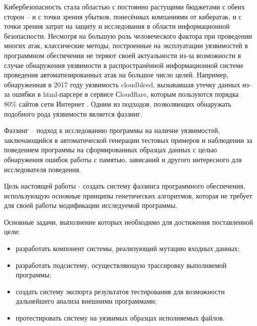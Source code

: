 \label{sec:intro}


Кибербезопасность стала областью с постоянно растущими бюджетами с обеих сторон -- и с точки зрения убытков, понесённых компаниями от кибератак, и с точки зрения затрат на защиту и исследования в области информационной безопасности. Несмотря на большую роль человеческого фактора при проведении многих атак, классические методы, построенные на эксплуатации уязвимостей в программном обеспечении не теряют своей актуальности из-за возможности в случае обнаружения уязвимости в распространённой информационной системе проведения автоматизированных атак на большое число целей. Например, обнаруженная в 2017 году уязвимость cloudbleed, вызывавшая утечку данных из-за ошибки в html-парсере в сервисе Сloudflare, которым пользуются порядка 80\% сайтов сети Интернет \cite{cloudbleed}. Одним из подходов, позволяющих обнаружать подобного рода уязвимости является фаззинг.





Фаззинг -- подход к исследованию программы на наличие уязвимостей, заключающийся в автоматической генерации тестовых примеров и наблюдении за поведением программы на сформированных образцах данных с целью обнаружения ошибок работы с памятью, зависаний и другого интересного для исследователя поведения.

Цель настоящей работы - создать систему фаззинга программного обеспечения, использующую основные принципы генетических алгоритмов, которая не требует для своей работы модификации исследуемой программы.

Основные задачи, выполнение которых необходимо для достижения поставленной цели:

\begin{itemize}
	\item разработать компонент системы, реализующий мутацию входных данных;
	
	\item разработать подсистему, осуществляющую трассировку выполняемой программы;
	
	\item создать систему экспорта результатов тестирования для возможности дальнейшего анализа внешними программами;
	
	\item протестировать систему на уязвимых образцах исполняемых файлов.
\end{itemize}